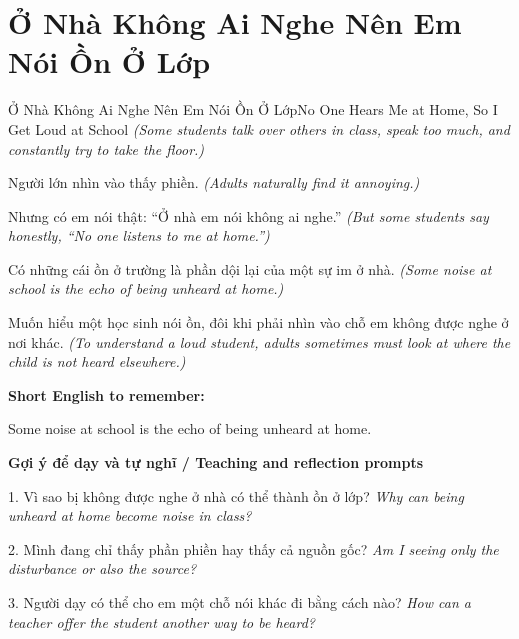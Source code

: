 \section{Ở Nhà Không Ai Nghe Nên Em Nói Ồn Ở Lớp}
\begin{truyen}{Ở Nhà Không Ai Nghe Nên Em Nói Ồn Ở Lớp}{No One Hears Me at Home, So I Get Loud at School}
\textit{(Some students talk over others in class, speak too much, and constantly try to take the floor.)}

Người lớn nhìn vào thấy phiền.
\textit{(Adults naturally find it annoying.)}

Nhưng có em nói thật: “Ở nhà em nói không ai nghe.”
\textit{(But some students say honestly, “No one listens to me at home.”)}

Có những cái ồn ở trường là phần dội lại của một sự im ở nhà.
\textit{(Some noise at school is the echo of being unheard at home.)}

\end{truyen}

\begin{baihoc}
Muốn hiểu một học sinh nói ồn, đôi khi phải nhìn vào chỗ em không được nghe ở nơi khác.
\textit{(To understand a loud student, adults sometimes must look at where the child is not heard elsewhere.)}
\end{baihoc}

\begin{ghinhoanh}
\textbf{Short English to remember:}

Some noise at school is the echo of being unheard at home.

\end{ghinhoanh}

\begin{tuhocnhanh}
\textbf{Gợi ý để dạy và tự nghĩ / Teaching and reflection prompts}

1. Vì sao bị không được nghe ở nhà có thể thành ồn ở lớp? \textit{Why can being unheard at home become noise in class?}

2. Mình đang chỉ thấy phần phiền hay thấy cả nguồn gốc? \textit{Am I seeing only the disturbance or also the source?}

3. Người dạy có thể cho em một chỗ nói khác đi bằng cách nào? \textit{How can a teacher offer the student another way to be heard?}
\end{tuhocnhanh}
\ngancach

